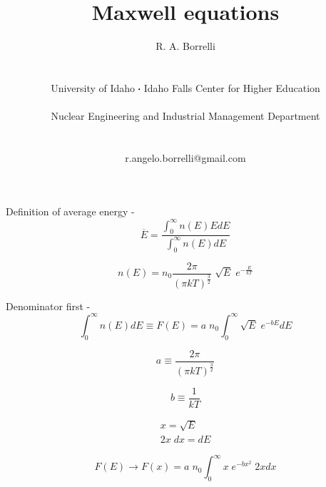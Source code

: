 \documentclass[11pt,a4paper]{article}
\newcommand*\sq{\mathbin{\vcenter{\hbox{\rule{.3ex}{.3ex}}}}} %
\begin{document}
\begin{titlepage}
    \title{
        Maxwell equations
    }
    \author{
        R. A. Borrelli
        \\ \\ \\
        University of Idaho $\sq$ Idaho Falls Center for Higher Education
        \\ \\
        Nuclear Engineering and Industrial Management Department
        \\ \\ \\
        r.angelo.borrelli@gmail.com
    }
\clearpage %
\maketitle
\thispagestyle{empty} %
\end{titlepage}

\noindent Definition of average energy - 
\begin{equation}
    \overline{E} = \frac{\int_0^{\infty} n(E)EdE}{\int_0^{\infty} n(E)dE}
\end{equation}

\begin{equation}
    n(E) = n_0 \frac{2\pi}{(\pi kT)^{\frac{3}{2}}} \; \sqrt{E} \; e^{-\frac{E}{kT}}
\end{equation}

\noindent Denominator first - 
\begin{equation}
    \int_0^{\infty} n(E)dE \equiv F(E) = a \; n_0 \int_0^{\infty} \sqrt{E} \; e^{-b E} dE 
\end{equation}

\begin{equation*}
    a \equiv \frac{2\pi}{(\pi kT)^{\frac{3}{2}}} 
\end{equation*}

\begin{equation*}
    b \equiv \frac{1}{kT}
\end{equation*}

\begin{equation*}
    \begin{gathered}
        x  = \sqrt{E}\\
        2x \; dx = dE
    \end{gathered}
\end{equation*}

\begin{equation}
    F(E) \rightarrow F(x) = a \; n_0 \int_0^\infty x \; e^{-bx^2} \; 2xdx
\end{equation}
\end{document}
